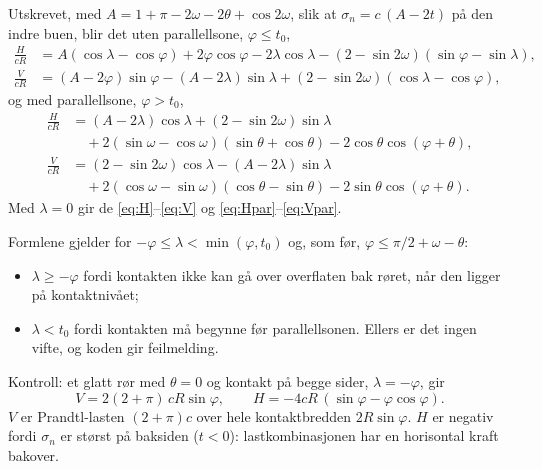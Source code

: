 \documentclass[11pt,a4paper]{article}
\begin{document}
Utskrevet, med $A = 1 + \pi - 2\omega - 2\theta + \cos 2\omega$, slik at
$\sigma_n = c\,(A - 2t)$ på den indre buen, blir det uten parallellsone,
$\varphi \le t_0$,
\begin{align}
  \frac{H}{cR} &= A(\cos\lambda - \cos\varphi) + 2\varphi\cos\varphi - 2\lambda\cos\lambda
                  - (2 - \sin 2\omega)(\sin\varphi - \sin\lambda) ,
  \label{eq:Hlambda}\\[4pt]
  \frac{V}{cR} &= (A - 2\varphi)\sin\varphi - (A - 2\lambda)\sin\lambda
                  + (2 - \sin 2\omega)(\cos\lambda - \cos\varphi) ,
  \label{eq:Vlambda}
\end{align}
og med parallellsone, $\varphi > t_0$,
\begin{align}
  \frac{H}{cR} &= (A - 2\lambda)\cos\lambda + (2 - \sin 2\omega)\sin\lambda \nonumber\\
               &\quad + 2(\sin\omega - \cos\omega)(\sin\theta + \cos\theta)
                  - 2\cos\theta\cos(\varphi+\theta) ,
  \label{eq:Hparlambda}\\[4pt]
  \frac{V}{cR} &= (2 - \sin 2\omega)\cos\lambda - (A - 2\lambda)\sin\lambda \nonumber\\
               &\quad + 2(\cos\omega - \sin\omega)(\cos\theta - \sin\theta)
                  - 2\sin\theta\cos(\varphi+\theta) .
  \label{eq:Vparlambda}
\end{align}
Med $\lambda = 0$ gir de \eqref{eq:H}--\eqref{eq:V} og
\eqref{eq:Hpar}--\eqref{eq:Vpar}.

Formlene gjelder for $-\varphi \le \lambda < \min(\varphi, t_0)$ og, som før,
$\varphi \le \pi/2 + \omega - \theta$:
\begin{itemize}
  \item $\lambda \ge -\varphi$ fordi kontakten ikke kan gå over overflaten
        bak røret, når den ligger på kontaktnivået;
  \item $\lambda < t_0$ fordi kontakten må begynne før parallellsonen.  Ellers
        er det ingen vifte, og koden gir feilmelding.
\end{itemize}

Kontroll: et glatt rør med $\theta = 0$ og kontakt på begge sider,
$\lambda = -\varphi$, gir
\begin{equation}
  V = 2(2 + \pi)\,cR\sin\varphi , \qquad
  H = -4cR\,(\sin\varphi - \varphi\cos\varphi) .
\end{equation}
$V$ er Prandtl-lasten $(2 + \pi)c$ over hele kontaktbredden $2R\sin\varphi$.
$H$ er negativ fordi $\sigma_n$ er størst på baksiden ($t < 0$):
lastkombinasjonen har en horisontal kraft bakover.
\end{document}
